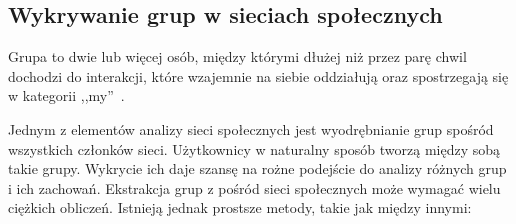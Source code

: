\subsection{Wykrywanie grup w sieciach społecznych}
\label{subsection:fastufoldingofcommunities}
Grupa to dwie lub więcej osób, między którymi dłużej niż przez parę chwil 
dochodzi do interakcji, które wzajemnie na siebie oddziałują oraz spostrzegają
się w kategorii ,,my''~\cite[s.~268]{SocialPsychology}.

Jednym z elementów analizy sieci społecznych jest wyodrębnianie grup spośród
wszystkich członków sieci. Użytkownicy w naturalny sposób tworzą między sobą
takie grupy. Wykrycie ich daje szansę na rożne podejście do analizy różnych grup
i ich zachowań. Ekstrakcja grup z pośród sieci społecznych może wymagać wielu
ciężkich obliczeń. Istnieją jednak prostsze metody, takie jak między innymi:

